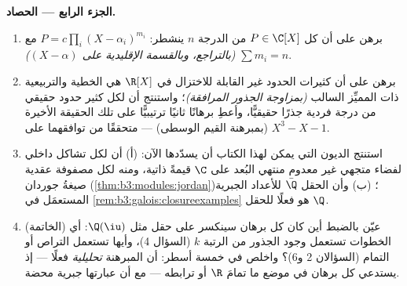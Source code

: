 \begin{problem}
\medskip
\noindent\textbf{الجزء الرابع --- الحصاد.}
\begin{enumerate}[resume]
  \item برهن على أن كل $P \in \C[X]$ من الدرجة $n$ ينشطر:
        $P = c\prod_{i}(X - \alpha_i)^{m_i}$ مع $\sum m_i =
        n$ \emph{(بالتراجع، وبالقسمة
        الإقليدية على $(X -
        \alpha)$)}.
  \item برهن على أن كثيرات الحدود غير القابلة للاختزال في
        $\R[X]$ هي الخطية والتربيعية ذات المميِّز السالب
        \emph{(بمزاوجة الجذور المرافقة)}؛ واستنتج أن لكل كثير
        حدود حقيقي من درجة فردية جذرًا حقيقيًّا، وأعطِ برهانًا
        ثانيًا ترتيبيًّا على تلك الحقيقة الأخيرة (بمبرهنة
        القيم الوسطى) --- متحققًا من توافقهما على
        $X^3 - X - 1$.
  \item استنتج الديون التي يمكن لهذا الكتاب أن يسدّدها الآن:
        (أ) أن لكل تشاكل داخلي لفضاء متجهي غير معدوم منتهي
        البُعد على $\C$ قيمةً ذاتية، ومنه لكل مصفوفة عقدية
        صيغةُ جوردان (\cref{thm:b3:modules:jordan})؛ (ب) وأن الحقل $\bar\Q$
        للأعداد الجبرية المستعمَل في \cref{rem:b3:galois:closureexamples} هو فعلًا  للحقل $\Q$.
  \item (الخاتمة) عيّن بالضبط أين كان كل برهان سينكسر على حقل
        مثل $\Q(\iu)$: أي الخطوات تستعمل وجود الجذور من الرتبة
        $k$ (السؤال 4)، وأيها تستعمل التراص أو التمام
        (السؤالان 2 و6)؟ واخلص في خمسة أسطر: أن المبرهنة
        \emph{تحليلية} فعلًا --- إذ يستدعي كل برهان في موضع ما
        تمامَ $\R$ أو ترابطه --- مع أن عبارتها جبرية محضة.
\end{enumerate}


\end{problem}
